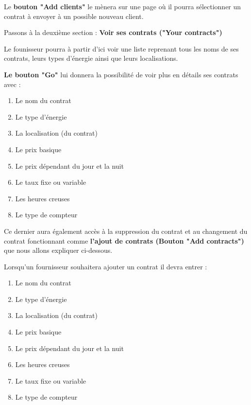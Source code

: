 \begin{flushleft}
Le \textbf{bouton "Add clients"} le mènera sur une page où il pourra sélectionner un contrat à envoyer à un possible nouveau client.
\end{flushleft}

\newpage

\begin{flushleft}
Passons à la deuxième section : \textbf{Voir ses contrats ("Your contracts")}
\end{flushleft}

\begin{flushleft}
Le founisseur pourra à partir d'ici voir une liste reprenant tous les noms de ses contrats, leurs types d'énergie ainsi que leurs localisations. 
\end{flushleft}

\begin{flushleft}
\textbf{Le bouton "Go"} lui donnera la possibilité de voir plus en détails ses contrats avec :
\end{flushleft}
\begin{enumerate}
\item Le nom du contrat
\item Le type d'énergie
\item La localisation (du contrat)
\item Le prix basique
\item Le prix dépendant du jour et la nuit
\item Le taux fixe ou variable
\item Les heures creuses
\item Le type de compteur
\end{enumerate}

\begin{flushleft}
Ce dernier aura également accès à la suppression du contrat et au changement du contrat fonctionnant comme \textbf{l'ajout de contrats (Bouton "Add contracts")} que nous allons expliquer ci-dessous.
\end{flushleft}

\begin{flushleft}
Lorsqu'un fournisseur souhaitera ajouter un contrat il devra entrer :
\end{flushleft}
\begin{enumerate}
\item Le nom du contrat
\item Le type d'énergie
\item La localisation (du contrat)
\item Le prix basique
\item Le prix dépendant du jour et la nuit
\item Les heures creuses
\item Le taux fixe ou variable
\item Le type de compteur
\end{enumerate}

